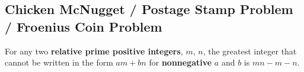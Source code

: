 \subsection{Chicken McNugget / Postage Stamp Problem / Froenius Coin Problem}

For any two \textbf{relative prime positive integers}, $m$, $n$, the greatest integer that cannot be written in the form $am + bn$ for \textbf{nonnegative} $a$ and $b$ is $mn-m-n$.

